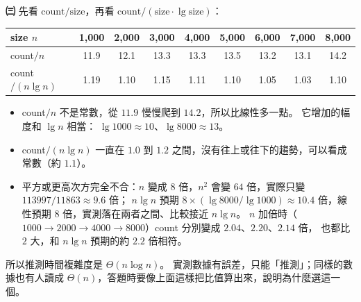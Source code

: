 \begin{pastsoln}
\textbf{㈢} 先看 $\text{count}/\text{size}$，再看 $\text{count}/(\text{size} \cdot \lg \text{size})$：
\begin{center}
\small
\setlength{\tabcolsep}{4pt}
\begin{tabular}{lcccccccc}
\toprule
size $n$ & 1,000 & 2,000 & 3,000 & 4,000 & 5,000 & 6,000 & 7,000 & 8,000 \\
\midrule
count$/n$ & 11.9 & 12.1 & 13.3 & 13.3 & 13.5 & 13.2 & 13.1 & 14.2 \\
count$/(n \lg n)$ & 1.19 & 1.10 & 1.15 & 1.11 & 1.10 & 1.05 & 1.03 & 1.10 \\
\bottomrule
\end{tabular}
\end{center}
\begin{itemize}
\item count$/n$ 不是常數，從 $11.9$ 慢慢爬到 $14.2$，所以比線性多一點。 它增加的幅度和 $\lg n$ 相當：
$\lg 1000 \approx 10$、$\lg 8000 \approx 13$。
\item count$/(n \lg n)$ 一直在 $1.0$ 到 $1.2$ 之間，沒有往上或往下的趨勢，可以看成常數（約 $1.1$）。
\item 平方或更高次方完全不合：$n$ 變成 $8$ 倍，$n^2$ 會變 $64$ 倍，實際只變 $113997/11863 \approx 9.6$ 倍；
$n \lg n$ 預期 $8 \times (\lg 8000/\lg 1000) \approx 10.4$ 倍，線性預期 $8$ 倍，實測落在兩者之間、比較接近
$n \lg n$。 $n$ 加倍時（$1000 \to 2000 \to 4000 \to 8000$）count 分別變成 $2.04$、$2.20$、$2.14$ 倍，
也都比 $2$ 大，和 $n \lg n$ 預期的約 $2.2$ 倍相符。
\end{itemize}
所以推測時間複雜度是 $\Theta(n \log n)$。 實測數據有誤差，只能「推測」；同樣的數據也有人讀成
$\Theta(n)$，答題時要像上面這樣把比值算出來，說明為什麼選這一個。
\end{pastsoln}
